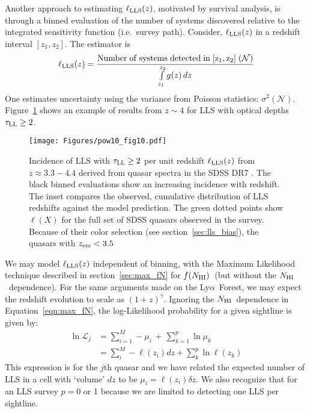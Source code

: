 \documentclass[graybox]{svmult}
\def\lya{Ly$\alpha$}
\def\smm{\sum\limits}
\def\intl{\int\limits}
\newcommand{\mnhi}{N_{\rm HI}}
\newcommand{\nhi}{$\mnhi$}
\def\mfnhi{f(\mnhi)}
\def\fnhi{$\mfnhi$}
\def\mzem{z_{\rm em}}
\begin{document}
Another approach to estimating $\ell_{\rm LLS}(z)$,
motivated by survival analysis, is through a binned
evaluation of the number of systems discovered relative
to the integrated sensitivity function (i.e.\ survey path).
Consider, $\ell_{\rm LLS}(z)$ in a redshift interval
$[z_1,z_2]$.  The estimator is
\begin{equation}
\ell_{\rm LLS}(z) = \frac{\rm Number \; of \; systems \; detected \; 
in \; [z_1,z_2] \;
(\mathcal{N})}{\intl_{z_1}^{z_2} g(z) \, dz}
\end{equation}
One estimates uncertainty using
the variance from Poisson statistics: $\sigma^2 (\mathcal{N})$.
Figure~\ref{fig:pow_fig10} shows an example of results
from $z \sim 4$ for LLS with optical depths
$\tau_{\rm LL} \ge 2$.

%
\begin{figure}[b]
\sidecaption
\texttt{[image: Figures/pow10\_fig10.pdf]}
%
%
\caption{Incidence of LLS with $\tau_{\rm LL} \ge 2$
per unit redshift $\ell_{\rm LLS}(z)$ from $z\approx 3.3-4.4$
derived from quasar spectra in the SDSS DR7 \cite{pow10}.
The black binned evaluations show an increasing incidence
with redshift.
The inset compares the observed, cumulative distribution of
LLS redshifts against the model prediction.
The green dotted points show $\ell(X)$ for the
full set of SDSS quasars observed in the survey.  Because
of their color selection (see section~\ref{sec:lls_bias}),
the quasars with $\mzem<3.5$ 
}
\label{fig:pow_fig10}       %
\end{figure}

We may model $\ell_{\rm LLS}(z)$ independent of binning, 
with the Maximum Likelihood technique described in 
section~\ref{sec:max_fN} for \fnhi\ (but without the
\nhi\ dependence).  
For the same arguments made on the \lya\ Forest, 
we may expect the redshift evolution to scale as $(1+z)^\gamma$.
Ignoring the \nhi\ dependence in Equation~\ref{eqn:max_fN},
the log-Likelihood probability for a given sightline is given by:
\begin{align}
\ln \mathcal{L}_j &= \smm_{i=1}^M -\mu_i \, + \, \smm_{k=1}^p \ln \mu_k \\
&= \smm_i^M -\ell(z_i) dz  + \smm_{k}^p \ln \ell(z_k) 
\label{eqn:max_LLS}
\end{align}
This expression is for the $j$th quasar and we have
related the expected number of LLS in a cell with `volume'
$dz$ to be $\mu_i = \ell(z_i) \delta z$.
We also recognize that for an LLS survey $p = 0$ or 1
because we are limited to detecting one LLS per sightline.
\end{document}

